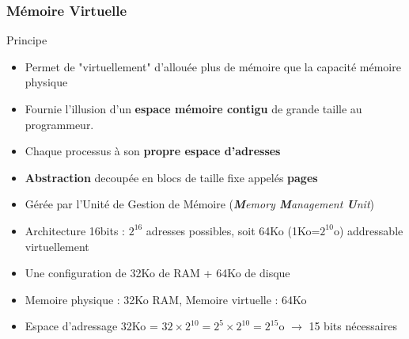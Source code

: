 \documentclass[8pt]{beamer}
\begin{document}
\begin{frame}
    \frametitle{Mémoire Virtuelle}
    \begin{block}{Principe}
        \begin{itemize}
            \item Permet de "virtuellement" d'allouée plus de mémoire que la
                  capacité mémoire physique
            \item Fournie l’illusion d’un \textbf{espace mémoire
                      contigu} de
                  grande
                  taille au programmeur.
            \item Chaque processus \`a son \textbf{propre espace
                      d'adresses}
            \item \textbf{Abstraction} decoup\'ee en blocs de taille
                  fixe appel\'es \textbf{pages}
            \item Gérée par l'Unité de Gestion de Mémoire
                  (\emph{\textbf{M}emory
                      \textbf{M}anagement \textbf{U}nit})

        \end{itemize}
    \end{block}
    \begin{example}
        \begin{itemize}
            \item Architecture 16bits : $2^{16}$ adresses possibles, soit 64Ko
                  (1Ko=$2^{10}$o) addressable virtuellement
            \item Une configuration de 32Ko de RAM + 64Ko de disque
            \item Memoire physique : 32Ko RAM, Memoire virtuelle : 64Ko
            \item Espace d'adressage 32Ko = $32 \times 2^{10} = 2^5
                      \times2^{10} = 2^{15}$o $\to$ 15 bits n\'ecessaires
        \end{itemize}
    \end{example}
\end{frame}
\end{document}
